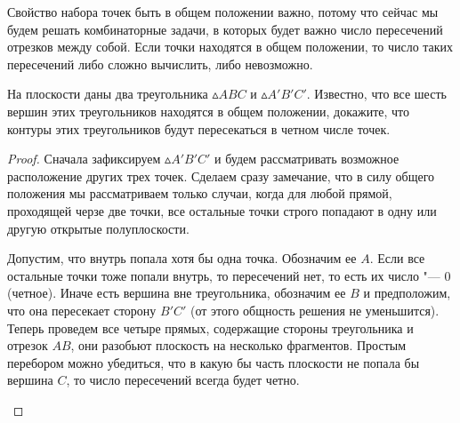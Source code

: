 	Свойство набора точек быть в общем положении важно, потому что сейчас мы будем решать комбинаторные задачи, в которых будет важно число пересечений отрезков между собой. Если точки находятся в общем положении, то число таких пересечений либо сложно вычислить, либо невозможно.
	
\begin{statement}
	На плоскости даны два треугольника $\vartriangle ABC$ и $\vartriangle A'B'C'$. Известно, что все шесть вершин этих треугольников находятся в общем положении, докажите, что контуры этих треугольников будут пересекаться в четном числе точек.
	
\begin{proof}
	Сначала зафиксируем $\vartriangle A'B'C'$ и будем рассматривать возможное расположение других трех точек. Сделаем сразу замечание, что в силу общего положения мы рассматриваем только случаи, когда для любой прямой, проходящей черзе две точки, все остальные точки строго попадают в одну или другую открытые полуплоскости.
	
\begin{paracol}{2}
	Допустим, что внутрь попала хотя бы одна точка. Обозначим ее $A$. Если все остальные точки тоже попали внутрь, то пересечений нет, то есть их число "--- $0$ (четное). Иначе есть вершина вне треугольника, обозначим ее $B$ и предположим, что она пересекает сторону $B'C'$ (от этого общность решения не уменьшится). Теперь проведем все четыре прямых, содержащие стороны треугольника и отрезок $AB$, они разобьют плоскость на несколько фрагментов. Простым перебором можно убедиться, что в какую бы часть плоскости не попала бы вершина $C$, то число пересечений всегда будет четно.
	
\switchcolumn

\begin{center}
\end{center}
\end{paracol}
\end{proof}
\end{statement}

